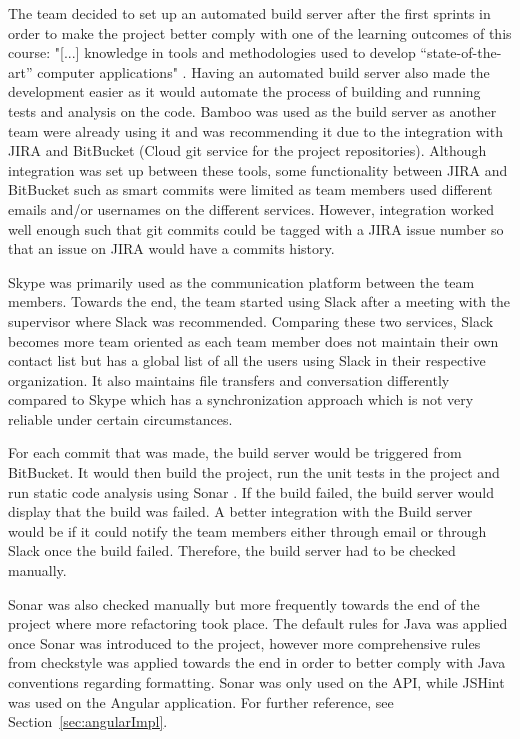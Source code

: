 The team decided to set up an automated build server after the first sprints in order to make the project better comply with one of the learning outcomes of this course: "[...] knowledge in tools and methodologies used to develop “state-of-the-art” computer applications" \cite{Gjovi52:online}. Having an automated build server also made the development easier as it would automate the process of building and running tests and analysis on the code. Bamboo \cite{Bamboo} was used as the build server as another team were already using it and was recommending it due to the integration with JIRA and BitBucket (Cloud git service for the project repositories). Although integration was set up between these tools, some functionality between JIRA and BitBucket such as smart commits \cite{JiraSmartCommits} were limited as team members used different emails and/or usernames on the different services. However, integration worked well enough such that git commits could be tagged with a JIRA issue number so that an issue on JIRA would have a commits history. 

Skype was primarily used as the communication platform between the team members. Towards the end, the team started using Slack after a meeting with the supervisor where Slack was recommended. Comparing these two services, Slack becomes more team oriented as each team member does not maintain their own contact list but has a global list of all the users using Slack in their respective organization. It also maintains file transfers and conversation differently compared to Skype which has a synchronization approach which is not very reliable under certain circumstances.

For each commit that was made, the build server would be triggered from BitBucket. It would then build the project, run the unit tests in the project and run static code analysis using Sonar \cite{Sonar98:online}. If the build failed, the build server would display that the build was failed. A better integration with the Build server would be if it could notify the team members either through email or through Slack once the build failed. Therefore, the build server had to be checked manually. 

Sonar was also checked manually but more frequently towards the end of the project where more refactoring took place. The default rules for Java was applied once Sonar was introduced to the project, however more comprehensive rules from checkstyle \cite{checkStyle:online} was applied towards the end in order to better comply with Java conventions regarding formatting. Sonar was only used on the API, while JSHint was used on the Angular application. For further reference, see Section~\ref{sec:angularImpl}.